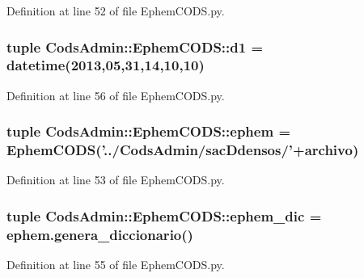 \-Definition at line 52 of file \-Ephem\-C\-O\-D\-S.\-py.

\subsubsection[{d1}]{\setlength{\rightskip}{0pt plus 5cm}tuple {\bf \-Cods\-Admin\-::\-Ephem\-C\-O\-D\-S\-::d1} = datetime(2013,05,31,14,10,10)}\label{namespace_cods_admin_1_1_ephem_c_o_d_s_aa3a3162da8693cb7cd5613386dbaca6f}


\-Definition at line 56 of file \-Ephem\-C\-O\-D\-S.\-py.

\subsubsection[{ephem}]{\setlength{\rightskip}{0pt plus 5cm}tuple {\bf \-Cods\-Admin\-::\-Ephem\-C\-O\-D\-S\-::ephem} = {\bf \-Ephem\-C\-O\-D\-S}('../\-Cods\-Admin/sac\-Ddensos/'+{\bf archivo})}\label{namespace_cods_admin_1_1_ephem_c_o_d_s_a81201ff957f3c454ee241874cb210b3c}


\-Definition at line 53 of file \-Ephem\-C\-O\-D\-S.\-py.

\subsubsection[{ephem\-\_\-dic}]{\setlength{\rightskip}{0pt plus 5cm}tuple {\bf \-Cods\-Admin\-::\-Ephem\-C\-O\-D\-S\-::ephem\-\_\-dic} = ephem.\-genera\-\_\-diccionario()}\label{namespace_cods_admin_1_1_ephem_c_o_d_s_a34c7dbe9aadecb4ff5c7439b80980788}


\-Definition at line 55 of file \-Ephem\-C\-O\-D\-S.\-py.

